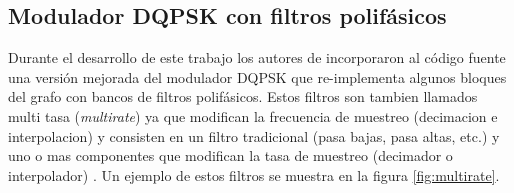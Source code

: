 \subsection{Modulador DQPSK con filtros polif\'asicos}
Durante el desarrollo de este trabajo los autores de \gnuradio incorporaron al c\'odigo fuente una
versi\'on mejorada del modulador DQPSK que re-implementa algunos bloques del grafo con bancos de
filtros polif\'asicos. Estos filtros son tambien llamados multi tasa (\emph{multirate}) ya que
modifican la frecuencia de muestreo (decimacion e interpolacion) y consisten en un filtro
tradicional (pasa bajas, pasa altas, etc.) y uno o mas componentes que modifican la tasa de muestreo
(decimador o interpolador) \cite{behrouz}. Un ejemplo de estos filtros se muestra en la figura \ref{fig:multirate}.

